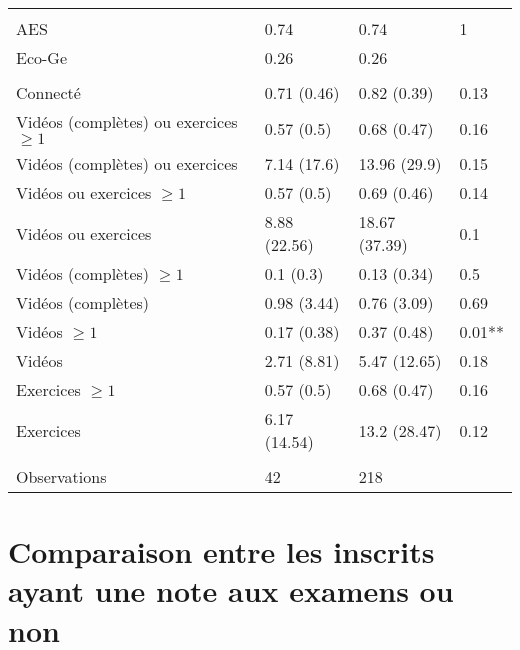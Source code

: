 \documentclass[
]{book}
\begin{document}
\begin{ThreePartTable}
\begin{longtable}[t]{llll}
\addlinespace[0.3em]
\multicolumn{4}{l}{\textbf{Filière}}\\
\hspace{1em}AES & 0.74 & 0.74 & 1\\
\hspace{1em}Eco-Ge & 0.26 & 0.26 & \\
\addlinespace[0.3em]
\multicolumn{4}{l}{\textbf{Plateforme}}\\
\hspace{1em}Connecté & 0.71 (0.46) & 0.82 (0.39) & 0.13\\
\hspace{1em}Vidéos (complètes) ou exercices $\geq 1$ & 0.57 (0.5) & 0.68 (0.47) & 0.16\\
\hspace{1em}Vidéos (complètes) ou exercices & 7.14 (17.6) & 13.96 (29.9) & 0.15\\
\hspace{1em}Vidéos ou exercices $\geq 1$ & 0.57 (0.5) & 0.69 (0.46) & 0.14\\
\hspace{1em}Vidéos ou exercices & 8.88 (22.56) & 18.67 (37.39) & 0.1\\
\hspace{1em}Vidéos (complètes) $\geq 1$ & 0.1 (0.3) & 0.13 (0.34) & 0.5\\
\hspace{1em}Vidéos (complètes) & 0.98 (3.44) & 0.76 (3.09) & 0.69\\
\hspace{1em}Vidéos $\geq 1$ & 0.17 (0.38) & 0.37 (0.48) & 0.01**\\
\hspace{1em}Vidéos & 2.71 (8.81) & 5.47 (12.65) & 0.18\\
\hspace{1em}Exercices $\geq 1$ & 0.57 (0.5) & 0.68 (0.47) & 0.16\\
\hspace{1em}Exercices & 6.17 (14.54) & 13.2 (28.47) & 0.12\\
\addlinespace[0.3em]
\multicolumn{4}{l}{\textbf{ }}\\
\hspace{1em}Observations & 42 & 218 & \\*
\end{longtable}
\end{ThreePartTable}
\endgroup{}

\setcounter{table}{0}
\setcounter{figure}{0}

\hypertarget{g20compinscvenuctqcm0venuctqcm1}{%
\section{Comparaison entre les inscrits ayant une note aux examens ou non}\label{g20compinscvenuctqcm0venuctqcm1}}
\end{document}
